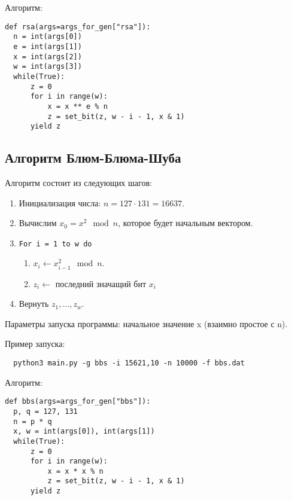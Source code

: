 \documentclass[spec, och, labwork]{shiza}
\begin{document}
Алгоритм:
\begin{small}
\begin{verbatim}
def rsa(args=args_for_gen["rsa"]):
  n = int(args[0])
  e = int(args[1])
  x = int(args[2])
  w = int(args[3])
  while(True):
      z = 0
      for i in range(w):
          x = x ** e % n
          z = set_bit(z, w - i - 1, x & 1)
      yield z
\end{verbatim}
\end{small}


\subsection{Алгоритм Блюм-Блюма-Шуба}

Алгоритм состоит из следующих шагов:
\begin{enumerate}
  \item Инициализация числа: $n = 127 \cdot 131 = 16637$.
  \item Вычислим $x_0 = x^2 \mod n$, которое будет начальным вектором.
  \item \texttt{For i = 1 to w do}
        \begin{enumerate}
          \item $x_i \leftarrow x_{i-1}^2 \mod n$.
          \item $z_i \leftarrow $ последний значащий бит $x_i$
        \end{enumerate}
  \item Вернуть $z_1, \dots, z_w$.
\end{enumerate}

Параметры запуска программы: начальное значение x (взаимно простое с n).

Пример запуска:
\begin{small}
\begin{verbatim}
  python3 main.py -g bbs -i 15621,10 -n 10000 -f bbs.dat
 \end{verbatim}
\end{small}

Алгоритм:
\begin{small}
\begin{verbatim}
def bbs(args=args_for_gen["bbs"]):
  p, q = 127, 131
  n = p * q
  x, w = int(args[0]), int(args[1])
  while(True):
      z = 0
      for i in range(w):
          x = x * x % n
          z = set_bit(z, w - i - 1, x & 1)
      yield z
\end{verbatim}
\end{small}
\end{document}
